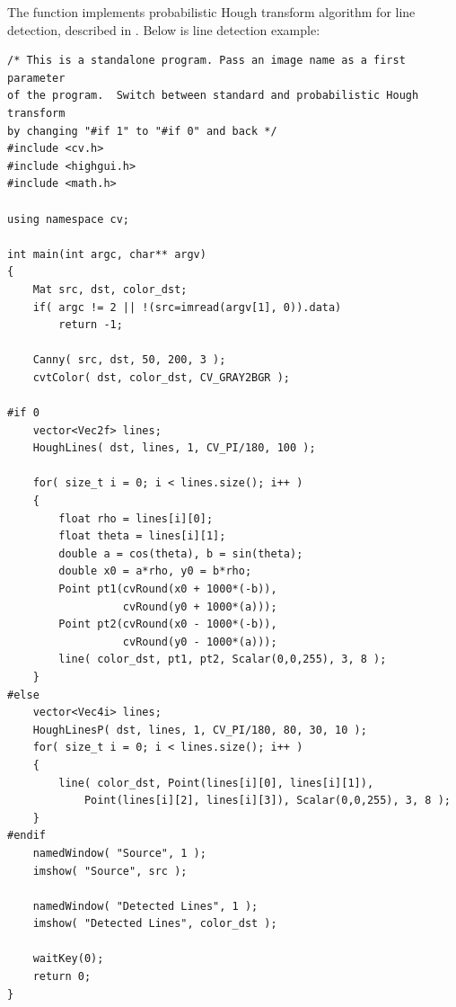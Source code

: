 \begin{description}
\end{description}

The function implements probabilistic Hough transform algorithm for line detection, described in \cite{Matas00}. Below is line detection example:

\begin{lstlisting}
/* This is a standalone program. Pass an image name as a first parameter
of the program.  Switch between standard and probabilistic Hough transform
by changing "#if 1" to "#if 0" and back */
#include <cv.h>
#include <highgui.h>
#include <math.h>

using namespace cv;

int main(int argc, char** argv)
{
    Mat src, dst, color_dst;
    if( argc != 2 || !(src=imread(argv[1], 0)).data)
        return -1;
        
    Canny( src, dst, 50, 200, 3 );
    cvtColor( dst, color_dst, CV_GRAY2BGR );    
        
#if 0
    vector<Vec2f> lines;
    HoughLines( dst, lines, 1, CV_PI/180, 100 );

    for( size_t i = 0; i < lines.size(); i++ )
    {
        float rho = lines[i][0];
        float theta = lines[i][1];
        double a = cos(theta), b = sin(theta);
        double x0 = a*rho, y0 = b*rho;
        Point pt1(cvRound(x0 + 1000*(-b)),
                  cvRound(y0 + 1000*(a)));
        Point pt2(cvRound(x0 - 1000*(-b)),
                  cvRound(y0 - 1000*(a)));
        line( color_dst, pt1, pt2, Scalar(0,0,255), 3, 8 );
    }
#else
    vector<Vec4i> lines;
    HoughLinesP( dst, lines, 1, CV_PI/180, 80, 30, 10 );
    for( size_t i = 0; i < lines.size(); i++ )
    {
        line( color_dst, Point(lines[i][0], lines[i][1]),
            Point(lines[i][2], lines[i][3]), Scalar(0,0,255), 3, 8 );
    }
#endif
    namedWindow( "Source", 1 );
    imshow( "Source", src );

    namedWindow( "Detected Lines", 1 );
    imshow( "Detected Lines", color_dst );

    waitKey(0);
    return 0;
}
\end{lstlisting}


